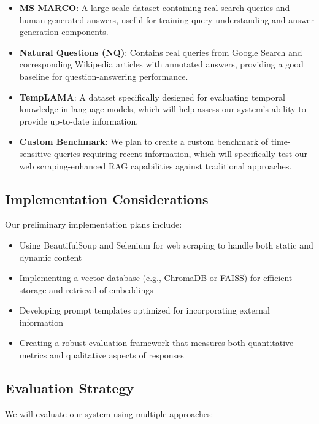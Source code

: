 \documentclass[fleqn,moreauthors,10pt]{ds_report}
\begin{document}
\begin{itemize}[noitemsep]
    \item \textbf{MS MARCO}: A large-scale dataset containing real search queries and human-generated answers, useful for training query understanding and answer generation components.
    
    \item \textbf{Natural Questions (NQ)}: Contains real queries from Google Search and corresponding Wikipedia articles with annotated answers, providing a good baseline for question-answering performance.
    
    \item \textbf{TempLAMA}: A dataset specifically designed for evaluating temporal knowledge in language models, which will help assess our system's ability to provide up-to-date information.
    
    \item \textbf{Custom Benchmark}: We plan to create a custom benchmark of time-sensitive queries requiring recent information, which will specifically test our web scraping-enhanced RAG capabilities against traditional approaches.
\end{itemize}

\subsection*{Implementation Considerations}
Our preliminary implementation plans include:

\begin{itemize}[noitemsep]
    \item Using BeautifulSoup and Selenium for web scraping to handle both static and dynamic content
    \item Implementing a vector database (e.g., ChromaDB or FAISS) for efficient storage and retrieval of embeddings
    \item Developing prompt templates optimized for incorporating external information
    \item Creating a robust evaluation framework that measures both quantitative metrics and qualitative aspects of responses
\end{itemize}

\subsection*{Evaluation Strategy}
We will evaluate our system using multiple approaches:
\end{document}
